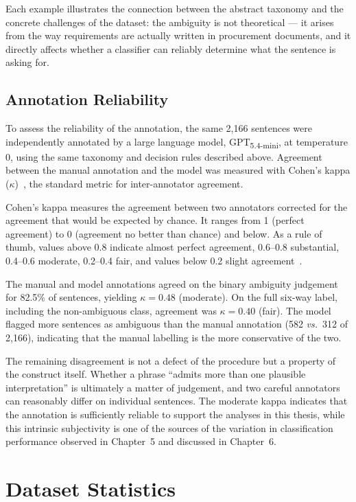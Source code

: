 Each example illustrates the connection between the abstract taxonomy and the concrete challenges of the dataset: the ambiguity is not theoretical — it arises from the way requirements are actually written in procurement documents, and it directly affects whether a classifier can reliably determine what the sentence is asking for.

\subsection{Annotation Reliability}

To assess the reliability of the annotation, the same 2,166 sentences were independently annotated by a large language model, GPT\textsubscript{5.4-mini}, at temperature 0, using the same taxonomy and decision rules described above. Agreement between the manual annotation and the model was measured with Cohen's kappa ($\kappa$)~\cite{cohen1960coefficient}, the standard metric for inter-annotator agreement.

Cohen's kappa measures the agreement between two annotators corrected for the agreement that would be expected by chance. It ranges from 1 (perfect agreement) to 0 (agreement no better than chance) and below. As a rule of thumb, values above 0.8 indicate almost perfect agreement, 0.6--0.8 substantial, 0.4--0.6 moderate, 0.2--0.4 fair, and values below 0.2 slight agreement~\cite{landis1977measurement}.

The manual and model annotations agreed on the binary ambiguity judgement for 82.5\% of sentences, yielding $\kappa = 0.48$ (moderate). On the full six-way label, including the non-ambiguous class, agreement was $\kappa = 0.40$ (fair). The model flagged more sentences as ambiguous than the manual annotation (582 \textit{vs.}~312 of 2,166), indicating that the manual labelling is the more conservative of the two.

The remaining disagreement is not a defect of the procedure but a property of the construct itself. Whether a phrase ``admits more than one plausible interpretation'' is ultimately a matter of judgement, and two careful annotators can reasonably differ on individual sentences. The moderate kappa indicates that the annotation is sufficiently reliable to support the analyses in this thesis, while this intrinsic subjectivity is one of the sources of the variation in classification performance observed in Chapter~5 and discussed in Chapter~6.

\section{Dataset Statistics}

